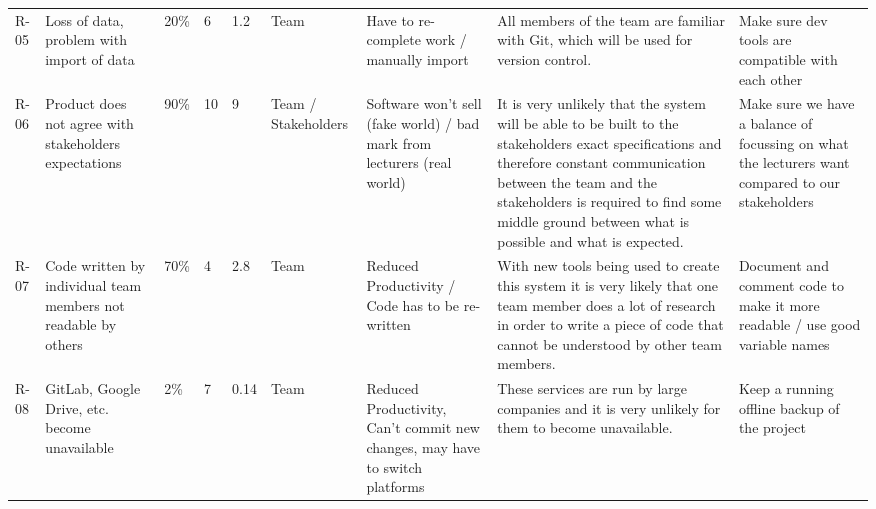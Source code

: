 \begin{tabular}{lllllllll}
R-05 & Loss of data, problem with import of data                                  & 20\%                                                           & 6                                                        & 1.2                                                          & Team                & Have to re-complete work / manually import                                                   & All members of the team are familiar with Git, which will be used for version control.                                                                                                                                                                                 & Make sure dev tools are compatible with each other                                               \\
R-06 & Product does not agree with stakeholders expectations                      & 90\%                                                           & 10                                                       & 9                                                            & Team / Stakeholders & Software won’t sell (fake world) / bad mark from lecturers (real world)                      & It is very unlikely that the system will be able to be built to the stakeholders exact specifications and therefore constant communication between the team and the stakeholders is required to find some middle ground between what is possible and what is expected. & Make sure we have a balance of focussing on what the lecturers want compared to our stakeholders \\
R-07 & Code written by individual team members not readable by others             & 70\%                                                           & 4                                                        & 2.8                                                          & Team                & Reduced Productivity / Code has to be re-written                                             & With new tools being used to create this system it is very likely that one team member does a lot of research in order to write a piece of code that cannot be understood by other team members.                                                                       & Document and comment code to make it more readable / use good variable names                     \\
R-08 & GitLab, Google Drive, etc. become unavailable                              & 2\%                                                            & 7                                                        & 0.14                                                         & Team                & Reduced Productivity, Can’t commit new changes, may have to switch platforms                 & These services are run by large companies and it is very unlikely for them to become unavailable.                                                                                                                                                                      & Keep a running offline backup of the project                                                     \\

\end{tabular}
